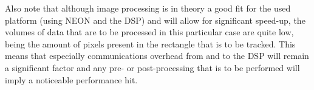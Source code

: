 \documentclass[final]{article}
\begin{document}
Also note that although image processing is in theory a good fit for the used platform (using NEON and the DSP) and will allow for significant speed-up, the volumes of data that are to be processed in this particular case are quite low, being the amount of pixels present in the rectangle that is to be tracked.
This means that especially communications overhead from and to the DSP will remain a significant factor and any pre- or post-processing that is to be performed will imply a noticeable performance hit.
\end{document}
